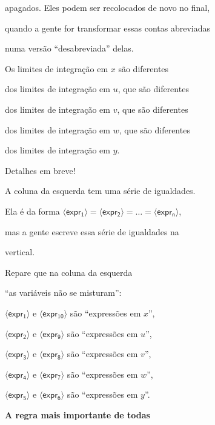 \documentclass[oneside,12pt]{article}
\begin{document}
apagados. Eles podem ser recolocados de novo no final,

quando a gente for transformar essas contas abreviadas

numa versão ``desabreviada'' delas.

\msk

Os limites de integração em $x$ são diferentes

dos limites de integração em $u$, que são diferentes

dos limites de integração em $v$, que são diferentes

dos limites de integração em $w$, que são diferentes

dos limites de integração em $y$.

\msk

Detalhes em breve!


\newpage


\def\expr#1{〈\mathsf{expr_{#1}}〉}


A coluna da esquerda tem uma série de igualdades.

Ela é da forma $\expr1 = \expr2 = \ldots = \expr{n}$,

mas a gente escreve essa série de igualdades na

vertical.

\msk

Repare que na coluna da esquerda

``as variáveis não se misturam'':

$\expr{1}$ e $\expr{10}$ são ``expressões em $x$'',

$\expr{2}$ e $\expr{9}$ são ``expressões em $u$'',

$\expr{3}$ e $\expr{8}$ são ``expressões em $v$'',

$\expr{4}$ e $\expr{7}$ são ``expressões em $w$'',

$\expr{5}$ e $\expr{6}$ são ``expressões em $y$''.


\newpage


{\bf A regra mais importante de todas}
\end{document}
